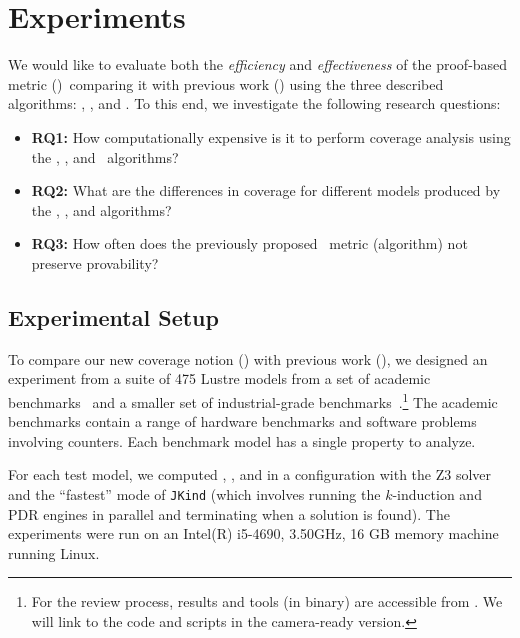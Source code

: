 \section{Experiments}
\label{sec:experiments}

We would like to evaluate both the {\em efficiency} and {\em
  effectiveness} of the proof-based metric (\ivccov)~comparing it with previous work (\nondetcov) using the three described algorithms: \ucalg, \ucbfalg, and \mustalg. To this end, we investigate the following research questions:
\begin{itemize}
    \item \textbf{RQ1:} How computationally expensive is it to perform coverage analysis using the \ucalg, \ucbfalg, and \mustalg\ algorithms?
    \item \textbf{RQ2:} What are the differences in coverage for different models produced by the \ucalg, \ucbfalg, and \mustalg algorithms?
    \item \textbf{RQ3:} How often does the previously proposed \nondetcov\ metric (\mustalg algorithm) not preserve provability?
\end{itemize}

\subsection{Experimental Setup}

To compare our new coverage notion (\ivccov) with previous work (\nondetcovalt), we designed an experiment from a suite of 475 Lustre models from a set of academic benchmarks~\cite{Hagen08:FMCAD} and a smaller set
of industrial-grade benchmarks~\cite{QFCS15:backes,hilt2013}.\footnote{For the review process, results and tools (in binary) are accessible from \cite{anoexpr}. We will link to the code and scripts in the camera-ready version.}
The academic benchmarks contain a range of hardware benchmarks and
software problems involving counters. Each benchmark model has a single property to analyze.

For each test model, we computed \ucalg, \ucbfalg, and \mustalg in a configuration with
the Z3 solver and the ``fastest'' mode of \texttt{JKind} (which involves running the $k$-induction and PDR engines
in parallel and terminating when a solution is found). The experiments were run on an
Intel(R) i5-4690, 3.50GHz, 16 GB memory machine running Linux.




